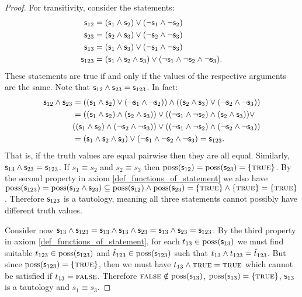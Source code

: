 \documentclass[11pt,letterpaper,fleqn]{memoir} %
\begin{document}
\begin{mathSection}
\begin{proof}
	For transitivity, consider the statements:
	\begin{align*}
\mathsf{s}_{12} &= (\mathsf{s}_1 \wedge \mathsf{s}_2) \vee (\neg\mathsf{s}_1 \wedge \neg\mathsf{s}_2) \\
\mathsf{s}_{23} &= (\mathsf{s}_2 \wedge \mathsf{s}_3) \vee (\neg\mathsf{s}_2 \wedge \neg\mathsf{s}_3) \\
\mathsf{s}_{13} &= (\mathsf{s}_1 \wedge \mathsf{s}_3) \vee (\neg\mathsf{s}_1 \wedge \neg\mathsf{s}_3) \\
\mathsf{s}_{123} &= (\mathsf{s}_1 \wedge \mathsf{s}_2 \wedge \mathsf{s}_3) \vee (\neg\mathsf{s}_1 \wedge \neg\mathsf{s}_2 \wedge \neg\mathsf{s}_3).
\end{align*}
These statements are true if and only if the values of the respective arguments are the same. Note that $\mathsf{s}_{12} \wedge \mathsf{s}_{23} = \mathsf{s}_{123}$. In fact:
	\begin{align*}
\mathsf{s}_{12} \wedge \mathsf{s}_{23}  &= ((\mathsf{s}_1 \wedge \mathsf{s}_2) \vee (\neg\mathsf{s}_1 \wedge \neg\mathsf{s}_2)) \wedge ((\mathsf{s}_2 \wedge \mathsf{s}_3) \vee (\neg\mathsf{s}_2 \wedge \neg\mathsf{s}_3)) \\
&= ((\mathsf{s}_1 \wedge \mathsf{s}_2) \wedge (\mathsf{s}_2 \wedge \mathsf{s}_3)) \vee ((\neg\mathsf{s}_1 \wedge \neg\mathsf{s}_2) \wedge (\mathsf{s}_2 \wedge \mathsf{s}_3)) \vee \\
& ((\mathsf{s}_1 \wedge \mathsf{s}_2) \wedge (\neg\mathsf{s}_2 \wedge \neg\mathsf{s}_3)) \vee ((\neg\mathsf{s}_1 \wedge \neg\mathsf{s}_2) \wedge (\neg\mathsf{s}_2 \wedge \neg\mathsf{s}_3)) \\
&= (\mathsf{s}_1 \wedge \mathsf{s}_2 \wedge \mathsf{s}_3) \vee (\neg\mathsf{s}_1 \wedge \neg\mathsf{s}_2 \wedge \neg\mathsf{s}_3) = \mathsf{s}_{123}.
\end{align*}
That is, if the truth values are equal pairwise then they are all equal. Similarly, $\mathsf{s}_{13} \wedge \mathsf{s}_{23} = \mathsf{s}_{123}$. If $s_1 \equiv s_2$ and $s_2 \equiv s_3$ then $\operatorname{poss}(\mathsf{s}_{12})=\operatorname{poss}(\mathsf{s}_{23})=\{\textsc{true}\}$. By the second property in axiom \ref{def_functions_of_statement} we also have $\operatorname{poss}(\mathsf{s}_{123}) = \operatorname{poss}(\mathsf{s}_{12} \wedge \mathsf{s}_{23}) \subseteq \operatorname{poss}(\mathsf{s}_{12}) \wedge \operatorname{poss}(\mathsf{s}_{23}) = \{\textsc{true}\} \wedge \{\textsc{true}\} = \{\textsc{true}\}$. Therefore $\mathsf{s}_{123}$ is a tautology, meaning all three statements cannot possibly have different truth values.

Consider now $\mathsf{s}_{13} \wedge \mathsf{s}_{123} = \mathsf{s}_{13} \wedge \mathsf{s}_{13} \wedge \mathsf{s}_{23} = \mathsf{s}_{13} \wedge \mathsf{s}_{23} = \mathsf{s}_{123}$. By the third property in axiom \ref{def_functions_of_statement}, for each $t_{13} \in \operatorname{poss}(\mathsf{s}_{13})$ we must find suitable $t_{123} \in \operatorname{poss}(\mathsf{s}_{123})$ and $\hat{t}_{123} \in \operatorname{poss}(\mathsf{s}_{123})$ such that $t_{13} \wedge t_{123} = \hat{t}_{123}$. But since $\operatorname{poss}(\mathsf{s}_{123}) = \{\textsc{true}\}$, then we must have $t_{13} \wedge \textsc{true} = \textsc{true}$ which cannot be satisfied if $t_{13}=\textsc{false}$. Therefore $\textsc{false} \notin \operatorname{poss}(\mathsf{s}_{13})$, $\operatorname{poss}(\mathsf{s}_{13})=\{\textsc{true}\}$, $\mathsf{s}_{13}$ is a tautology and $s_1 \equiv s_3$.
\end{proof}

\end{mathSection}
\end{document}
